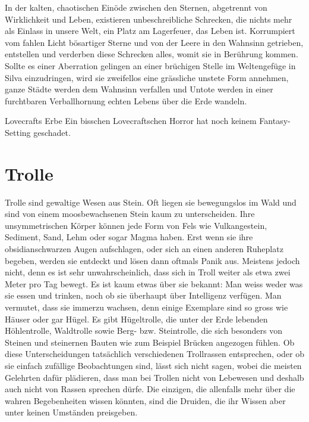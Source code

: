 \documentclass[12pt,twoside,twocolumn,openany]{book}
\begin{document}
In der kalten, chaotischen Einöde zwischen den Sternen, abgetrennt von Wirklichkeit und Leben, existieren unbeschreibliche Schrecken, die nichts mehr als Einlass in unsere Welt, ein Platz am Lagerfeuer, das Leben ist. Korrumpiert vom fahlen Licht bösartiger Sterne und von der Leere in den Wahnsinn getrieben, entstellen und verderben diese Schrecken alles, womit sie in Berührung kommen. Sollte es einer Aberration gelingen an einer brüchigen Stelle im Weltengefüge in Silva einzudringen, wird sie zweifellos eine grässliche unstete Form annehmen, ganze Städte werden dem Wahnsinn verfallen und Untote werden in einer furchtbaren Verballhornung echten Lebens über die Erde wandeln.

\begin{commentbox}{Lovecrafts Erbe}
	Ein bisschen Lovecraftschen Horror hat noch keinem Fantasy-Setting geschadet.
\end{commentbox}



\section{Trolle} 

Trolle sind gewaltige Wesen aus Stein. Oft liegen sie bewegungslos im Wald und sind von einem moosbewachsenen Stein kaum zu unterscheiden. Ihre unsymmetrischen Körper können jede Form von Fels wie Vulkangestein, Sediment, Sand, Lehm oder sogar Magma haben. Erst wenn sie ihre obsidianschwarzen Augen aufschlagen, oder sich an einen anderen Ruheplatz begeben, werden sie entdeckt und lösen dann oftmals Panik aus. Meistens jedoch nicht, denn es ist sehr unwahrscheinlich, dass sich in Troll weiter als etwa zwei Meter pro Tag bewegt. Es ist kaum etwas über sie bekannt: Man weiss weder was sie essen und trinken, noch ob sie überhaupt über Intelligenz verfügen. Man vermutet, dass  sie immerzu wachsen, denn einige Exemplare sind so gross wie Häuser oder gar Hügel. Es gibt Hügeltrolle, die unter der Erde lebenden Höhlentrolle, Waldtrolle sowie Berg- bzw. Steintrolle, die sich besonders von Steinen und steinernen Bauten wie zum Beispiel Brücken angezogen fühlen.
Ob diese Unterscheidungen tatsächlich verschiedenen Trollrassen entsprechen, oder ob sie einfach zufällige Beobachtungen sind, lässt sich nicht sagen, wobei die meisten Gelehrten dafür plädieren, dass man bei Trollen nicht von Lebewesen und deshalb auch nicht von Rassen sprechen dürfe.
Die einzigen, die allenfalls mehr über die wahren Begebenheiten wissen könnten, sind die Druiden, die ihr Wissen aber unter keinen Umständen preisgeben.
\end{document}
